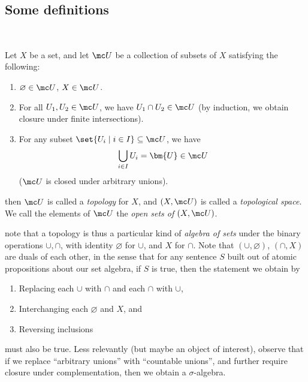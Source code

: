 \documentclass{fkbook}
\theoremstyle{snazzydefinition}
\begin{document}
\begin{adjustwidth}{1em}{1em}
  \subsection{Some definitions}~
  \vspace{-.75em}
  \begin{definition}
    Let $X$ be a set, and let $\mc U$ be a collection of subsets of
    $X$ satisfying the following:
    \begin{enumerate}[label=(\roman*)]
      \item $\varnothing \in \mc U$, $X \in \mc U$.
      \item For all $U_1, U_2 \in \mc U$, we have $U_1 \cap U_2 \in
        \mc U$ (by induction, we obtain closure under finite
        intersections).
      \item For any subset $\set{U_i \mid i \in I} \subseteq \mc U$,
        we have
        \[
          \bigcup_{i \in I} U_i = \bm{U} \in \mc U
        \]
        ($\mc U$ is closed under arbitrary unions).
    \end{enumerate}
    then $\mc U$ is called a \emph{topology} for $X$, and $(X, \mc U)$
    is called a \emph{topological space}. We call the elements of $\mc
    U$ the \emph{open sets of} $(X, \mc U)$.
  \end{definition}
  note that a topology is thus a particular kind of \emph{algebra of
    sets} under the binary operations $\cup, \cap$, with identity
  $\varnothing$ for $\cup$, and $X$ for $\cap$. Note that $(\cup,
  \varnothing)$, $(\cap, X)$ are duals of each other, in the sense
  that for any sentence $S$ built out of atomic propositions about our
  set algebra, if $S$ is true, then the statement we obtain by
  \begin{enumerate}[label=\arabic*.]
    \item Replacing each $\cup$ with $\cap$ and each $\cap$ with
      $\cup$,
    \item Interchanging each $\varnothing$ and $X$, and
    \item Reversing inclusions
  \end{enumerate}
  must also be true. Less relevantly (but maybe an object of
  interest), observe that if we replace ``arbitrary unions'' with
  ``countable unions'', and further require closure under
  complementation, then we obtain a $\sigma$-algebra.


\end{adjustwidth}
\end{document}
